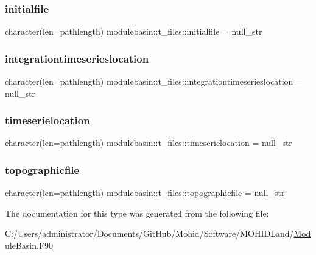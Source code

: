 \subsubsection{\texorpdfstring{initialfile}{initialfile}}
{\footnotesize\ttfamily character(len=pathlength) modulebasin\+::t\+\_\+files\+::initialfile = null\+\_\+str\hspace{0.3cm}{\ttfamily [private]}}

\mbox{\label{structmodulebasin_1_1t__files_aa76d2d55d47806c4db59101f50d65123}} 
\subsubsection{\texorpdfstring{integrationtimeserieslocation}{integrationtimeserieslocation}}
{\footnotesize\ttfamily character(len=pathlength) modulebasin\+::t\+\_\+files\+::integrationtimeserieslocation = null\+\_\+str\hspace{0.3cm}{\ttfamily [private]}}

\mbox{\label{structmodulebasin_1_1t__files_a56c413fe2bfbe7d1930f7c1d0ffe1ef4}} 
\subsubsection{\texorpdfstring{timeserielocation}{timeserielocation}}
{\footnotesize\ttfamily character(len=pathlength) modulebasin\+::t\+\_\+files\+::timeserielocation = null\+\_\+str\hspace{0.3cm}{\ttfamily [private]}}

\mbox{\label{structmodulebasin_1_1t__files_ad71287bd7c4fdfc427731fb881c60841}} 
\subsubsection{\texorpdfstring{topographicfile}{topographicfile}}
{\footnotesize\ttfamily character(len=pathlength) modulebasin\+::t\+\_\+files\+::topographicfile = null\+\_\+str\hspace{0.3cm}{\ttfamily [private]}}



The documentation for this type was generated from the following file\+:\begin{DoxyCompactItemize}
\item 
C\+:/\+Users/administrator/\+Documents/\+Git\+Hub/\+Mohid/\+Software/\+M\+O\+H\+I\+D\+Land/\mbox{\hyperlink{_module_basin_8_f90}{Module\+Basin.\+F90}}\end{DoxyCompactItemize}
